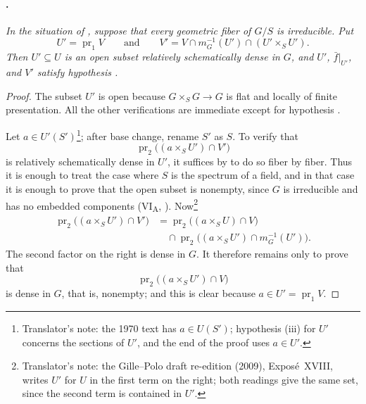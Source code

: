 \paragraph{.}
\textit{In the situation of , suppose that every geometric fiber
of \(G/S\) is irreducible. Put
\[
  U'=\operatorname{pr}_1V
  \qquad\text{and}\qquad
  V'=V\cap m_G^{-1}(U')\cap(U'\times_S U').
\]
Then \(U'\subseteq U\) is an open subset relatively schematically
dense in \(G\), and \(U'\), \(\bar f|_{U'}\), and \(V'\) satisfy
hypothesis \textup{}.}

\begin{proof}
The subset \(U'\) is open because
\(G\times_S G\to G\) is flat and locally of finite presentation.
All the other verifications are immediate except for hypothesis
\textup{}.

Let \(a\in U'(S')\)\footnote{Translator's note: the 1970 text has \(a\in U(S')\);
hypothesis \textup{(iii)} for \(U'\) concerns the sections of \(U'\), and the end of the proof uses
\(a\in U'\).}; after base change, rename \(S'\) as \(S\). To
verify that
\[
  \operatorname{pr}_2\bigl((a\times_S U')\cap V'\bigr)
\]
is relatively schematically dense in \(U'\), it suffices by
 to do so fiber by fiber. Thus it is enough to treat the
case where \(S\) is the spectrum of a field, and in that case it is
enough to prove that the open subset is nonempty, since \(G\) is irreducible
and has no embedded components (VI\textsubscript{A}, ).
Now\footnote{Translator's note: the Gille--Polo draft re-edition (2009), Exposé~XVIII, writes
\(U'\) for \(U\) in the first term on the right; both readings give the same set, since the second term
is contained in \(U'\).}
\[
\begin{aligned}
  \operatorname{pr}_2\bigl((a\times_S U')\cap V'\bigr)
  &=
  \operatorname{pr}_2\bigl((a\times_S U)\cap V\bigr)\\
  &\quad{}\cap
  \operatorname{pr}_2\bigl((a\times_S U')\cap m_G^{-1}(U')\bigr).
\end{aligned}
\]
The second factor on the right is dense in \(G\). It therefore
remains only to prove that
\[
  \operatorname{pr}_2\bigl((a\times_S U')\cap V\bigr)
\]
is dense in \(G\), that is, nonempty; and this is clear because
\(a\in U'=\operatorname{pr}_1V\).
\end{proof}

